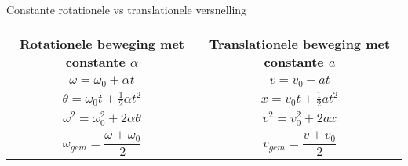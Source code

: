 
\begin{app}{Constante rotationele vs translationele versnelling}
    \vspace{-0.2cm}
    \begin{center}
        \def\arraystretch{2}
        \begin{tabular}{c|c}
            Rotationele beweging met constante $ \alpha $ & Translationele beweging  met constante $ a $ \\ \hline
            $ \omega = \omega_0 + \alpha t $ & $ v = v_0 +at $\\
            $ \theta = \omega_0t + \tfrac{1}{2}\alpha t^2 $ & $ x = v_0t + \tfrac{1}{2}at^2 $ \\
            $ \omega^2 = \omega_0^2 + 2\alpha\theta $ & $ v^2 = v_0^2 + 2ax $\\
            $ \omega_{gem} = \dfrac{\omega + \omega_0}{2}$ & $ v_{gem} = \dfrac{v+v_0}{2} $
        \end{tabular}
    \end{center}
\end{app}
 
